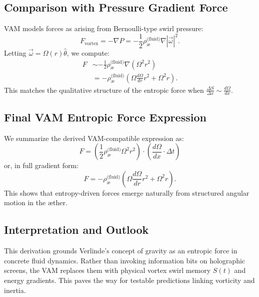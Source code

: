 \documentclass[preprint]{revtex4-2}
\begin{document}
            \subsection*{Comparison with Pressure Gradient Force}
            VAM models forces as arising from Bernoulli-type swirl pressure:
            \begin{equation}
                F_\text{vortex} = -\nabla P = -\frac{1}{2} \rho_{\text{\ae}}^{\text{(fluid)}} \nabla |\vec{\omega}|^2.
            \end{equation}
            Letting $\vec{\omega} = \Omega(r) \hat{\theta}$, we compute:
            \begin{align}
                F &\sim -\frac{1}{2} \rho_{\text{\ae}}^{\text{(fluid)}} \nabla (\Omega^2 r^2) \\
                  &= -\rho_{\text{\ae}}^{\text{(fluid)}} \left( \Omega \frac{d\Omega}{dr} r^2 + \Omega^2 r \right).
            \end{align}
            This matches the qualitative structure of the entropic force when $\frac{\Delta S}{\Delta x} \sim \frac{d\Omega}{dx}$.

            \subsection{Final VAM Entropic Force Expression}
            We summarize the derived VAM-compatible expression as:
            \begin{equation}
                F = \left( \frac{1}{2} \rho_{\text{\ae}}^{\text{(fluid)}} \Omega^2 r^2 \right) \cdot \left( \frac{d\Omega}{dx} \cdot \Delta t \right)
            \end{equation}
            or, in full gradient form:
            \begin{equation}
                F = -\rho_{\text{\ae}}^{\text{(fluid)}} \left( \Omega \frac{d\Omega}{dr} r^2 + \Omega^2 r \right).
            \end{equation}
            This shows that entropy-driven forces emerge naturally from structured angular motion in the æther.

            \subsection*{Interpretation and Outlook}
            This derivation grounds Verlinde's concept of gravity as an entropic force in concrete fluid dynamics. Rather than invoking information bits on holographic screens, the VAM replaces them with physical vortex swirl memory $S(t)$ and energy gradients. This paves the way for testable predictions linking vorticity and inertia.
\end{document}
